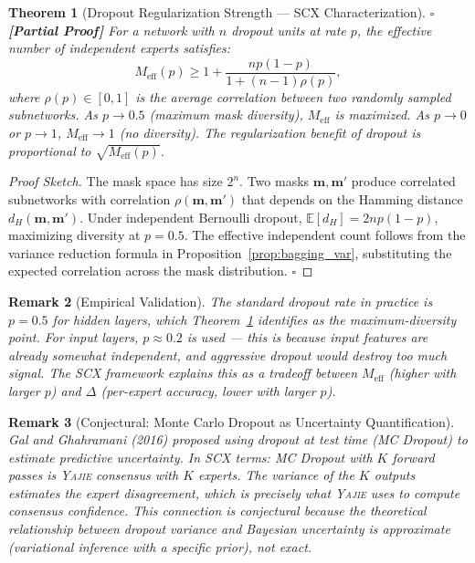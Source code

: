 \documentclass[12pt,a4paper]{article}
\newtheorem{theorem}{Theorem}[section]
\newtheorem{remark}[theorem]{Remark}
\theoremstyle{definition}
\newcommand{\rigorPartial}{{\color{rigorcolor}$\square$\,\textbf{[Partial Proof]}}}
\newcommand{\Yajie}{\textsc{Yajie}}
\newcommand{\SCX}{\textsc{SCX}}
\newcommand{\E}{\mathbb{E}}
\begin{document}
\begin{theorem}[Dropout Regularization Strength — SCX Characterization]\label{thm:dropout_bound}
\rigorPartial
For a network with $n$ dropout units at rate $p$, the effective number of independent experts satisfies:
\begin{equation}\label{eq:dropout_Meff}
    M_{\text{eff}}(p) \ge 1 + \frac{n p (1-p)}{1 + (n-1)\rho(p)},
\end{equation}
where $\rho(p) \in [0,1]$ is the average correlation between two randomly sampled subnetworks. As $p \to 0.5$ (maximum mask diversity), $M_{\text{eff}}$ is maximized. As $p \to 0$ or $p \to 1$, $M_{\text{eff}} \to 1$ (no diversity). The regularization benefit of dropout is proportional to $\sqrt{M_{\text{eff}}(p)}$.
\end{theorem}

\begin{proof}[Proof Sketch]
The mask space has size $2^n$. Two masks $\mathbf{m}, \mathbf{m}'$ produce correlated subnetworks with correlation $\rho(\mathbf{m}, \mathbf{m}')$ that depends on the Hamming distance $d_H(\mathbf{m}, \mathbf{m}')$. Under independent Bernoulli dropout, $\E[d_H] = 2np(1-p)$, maximizing diversity at $p=0.5$. The effective independent count follows from the variance reduction formula in Proposition~\ref{prop:bagging_var}, substituting the expected correlation across the mask distribution. \hfill $\square$
\end{proof}

\begin{remark}[Empirical Validation]
The standard dropout rate in practice is $p = 0.5$ for hidden layers, which Theorem~\ref{thm:dropout_bound} identifies as the maximum-diversity point. For input layers, $p \approx 0.2$ is used — this is because input features are already somewhat independent, and aggressive dropout would destroy too much signal. The \SCX{} framework explains this as a tradeoff between $M_{\text{eff}}$ (higher with larger $p$) and $\Delta$ (per-expert accuracy, lower with larger $p$).
\end{remark}

\begin{remark}[Conjectural: Monte Carlo Dropout as Uncertainty Quantification]
Gal and Ghahramani (2016) proposed using dropout at test time (MC Dropout) to estimate predictive uncertainty. In \SCX{} terms: MC Dropout with $K$ forward passes is \Yajie{} consensus with $K$ experts. The variance of the $K$ outputs estimates the \emph{expert disagreement}, which is precisely what \Yajie{} uses to compute consensus confidence. This connection is conjectural because the theoretical relationship between dropout variance and Bayesian uncertainty is approximate (variational inference with a specific prior), not exact.
\end{remark}
\end{document}
